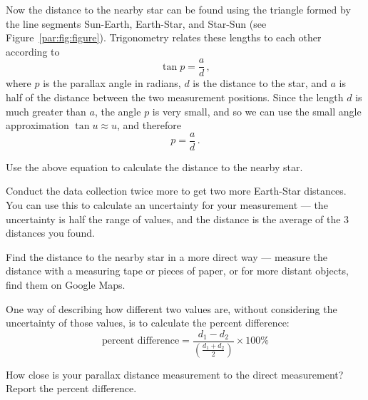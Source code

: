 Now the distance to the nearby star can be found using the triangle formed by the line segments Sun-Earth, Earth-Star, and Star-Sun (see Figure~\ref{par:fig:figure}). Trigonometry relates these lengths to each other according to
\begin{equation}
	\tan p = \frac{a}{d}\,,
\end{equation}
where $p$ is the parallax angle in radians, $d$ is the distance to the star, and $a$ is half of the distance between the two measurement positions. Since the length $d$ is much greater than $a$, the angle $p$ is very small, and so we can use the small angle approximation $\tan u \approx u$, and therefore
\begin{equation}
	p = \frac{a}{d}\,.
\end{equation}

\begin{steps}
	\item Use the above equation to calculate the distance to the nearby star.
	
	\item Conduct the data collection twice more to get two more Earth-Star distances. You can use this to calculate an uncertainty for your measurement --- the uncertainty is half the range of values, and the distance is the average of the 3 distances you found.
	
	\item Find the distance to the nearby star in a more direct way --- measure the distance with a measuring tape or pieces of paper, or for more distant objects, find them on Google Maps.
\end{steps}

One way of describing how different two values are, without considering the uncertainty of those values, is to calculate the percent difference:
\begin{equation}
\textrm{percent difference} = \frac{d_1 - d_2}{\left(\frac{d_1+d_2}{2}\right)} \times 100\%
\end{equation}

\begin{steps}	
	\item How close is your parallax distance measurement to the direct measurement? Report the percent difference.
\end{steps}

